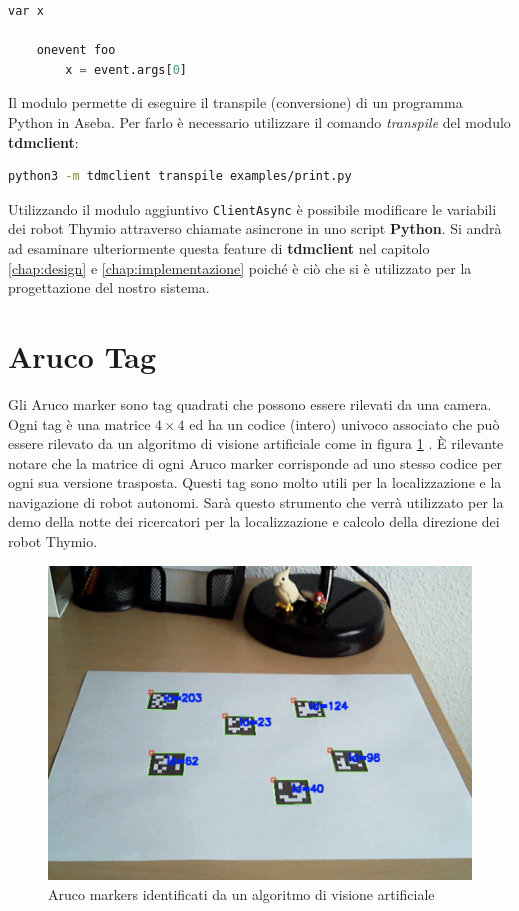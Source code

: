 \documentclass[12pt,a4paper,openright,twoside]{book}
\begin{document}
\begin{lstlisting}[language=Python, label={lst:thymio-catch-event}, caption={Esempio di programma interno a Thymio per la ricezione di eventi (foo)}]
    var x

    onevent foo
        x = event.args[0]
\end{lstlisting}

Il modulo permette di eseguire il transpile (conversione) di un programma Python in Aseba. Per farlo è necessario utilizzare il comando \textit{transpile} del modulo \textbf{tdmclient}:

\begin{lstlisting}[language=Bash, label={lst:transpile-python-to-aseba}, caption={Esempio di transpile di un programma Python (print.py) in Aseba}]
    python3 -m tdmclient transpile examples/print.py
\end{lstlisting}

Utilizzando il modulo aggiuntivo \verb|ClientAsync| è possibile modificare le variabili dei robot Thymio attraverso chiamate asincrone in uno script \textbf{Python}.
Si andrà ad esaminare ulteriormente questa feature di \textbf{tdmclient} nel capitolo \ref{chap:design} e \ref{chap:implementazione} poiché è ciò che si è utilizzato per la progettazione del nostro sistema.

\section{Aruco Tag}

Gli Aruco marker sono tag quadrati che possono essere rilevati da una camera. Ogni tag è una matrice $4 \times 4$ ed ha un codice (intero) univoco associato che può essere rilevato da un algoritmo di visione artificiale come in figura \ref{fig:aruco-markers} \cite{opencvOpenCVDetection}. È rilevante notare che la matrice di ogni Aruco marker corrisponde ad uno stesso codice per ogni sua versione trasposta. 
Questi tag sono molto utili per la localizzazione e la navigazione di robot autonomi. Sarà questo strumento che verrà utilizzato per la demo della notte dei ricercatori per la localizzazione e calcolo della direzione dei robot Thymio.

\begin{figure}
    \centering
    \includegraphics[width=.8\linewidth]{figures/aruco-markers.png}
    \caption{Aruco markers identificati da un algoritmo di visione artificiale}
    \label{fig:aruco-markers}
\end{figure}
\end{document}
